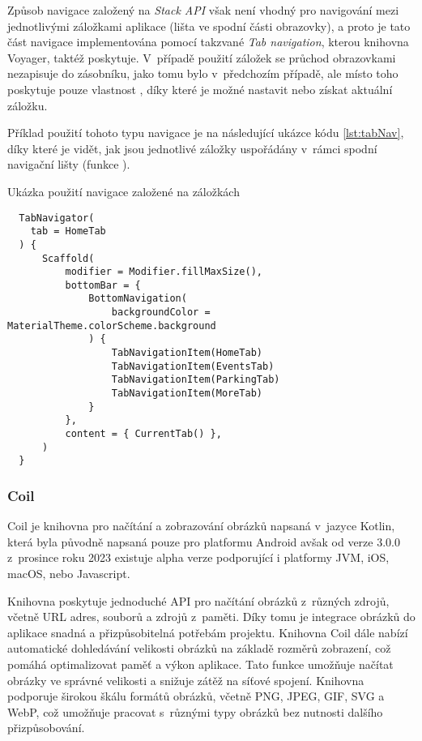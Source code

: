\medskip

Způsob navigace založený na \textit{Stack API} však není vhodný pro navigování mezi jednotlivými záložkami aplikace (lišta ve spodní 
části obrazovky), a proto je tato část navigace implementována pomocí takzvané \textit{Tab navigation}, kterou knihovna Voyager, taktéž poskytuje.
V~případě použití záložek se průchod obrazovkami nezapisuje do zásobníku, jako tomu bylo v~předchozím případě, ale místo toho poskytuje pouze vlastnost 
, díky které je možné nastavit nebo získat aktuální záložku. \cite{voyagerTabNav} 

\medskip

Příklad použití tohoto typu navigace je na následující ukázce kódu \ref{lst:tabNav}, díky které je vidět, jak jsou jednotlivé záložky 
uspořádány v~rámci spodní navigační lišty (funkce ).

\begin{listing}[H]
\caption{Ukázka použití navigace založené na záložkách}\label{lst:tabNav}
\begin{verbatim}
  TabNavigator(
    tab = HomeTab
  ) {
      Scaffold(
          modifier = Modifier.fillMaxSize(),
          bottomBar = {
              BottomNavigation(
                  backgroundColor = MaterialTheme.colorScheme.background
              ) {
                  TabNavigationItem(HomeTab)
                  TabNavigationItem(EventsTab)
                  TabNavigationItem(ParkingTab)
                  TabNavigationItem(MoreTab)
              }
          },
          content = { CurrentTab() },
      )
  }
\end{verbatim}
\end{listing}

\subsubsection*{Coil}
Coil je knihovna pro načítání a zobrazování obrázků napsaná v~jazyce Kotlin, která byla původně napsaná pouze pro platformu Android avšak
od verze 3.0.0 z~prosince roku 2023 existuje alpha verze podporující i platformy JVM, iOS, macOS, nebo Javascript.  

\medskip

Knihovna poskytuje jednoduché API pro načítání obrázků
z~různých zdrojů, včetně URL adres, souborů a zdrojů z~paměti. Díky tomu je integrace obrázků do aplikace snadná a přizpůsobitelná potřebám projektu.
Knihovna Coil dále nabízí automatické dohledávání velikosti obrázků na základě rozměrů zobrazení, což pomáhá optimalizovat paměť a výkon aplikace. Tato funkce 
umožňuje načítat obrázky ve správné velikosti a snižuje zátěž na síťové spojení. Knihovna podporuje širokou škálu formátů obrázků, včetně PNG, 
JPEG, GIF, SVG a WebP, což umožňuje pracovat s~různými typy obrázků bez nutnosti dalšího přizpůsobování.

